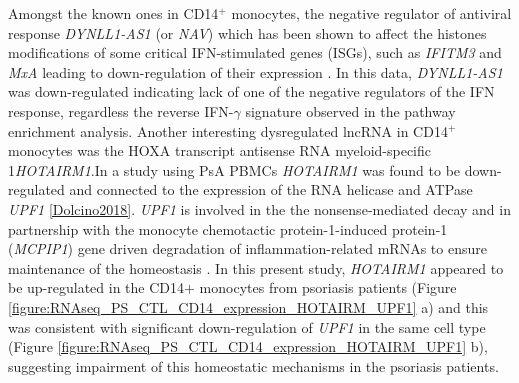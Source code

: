 Amongst the known ones in CD14$^+$ monocytes, the negative regulator of antiviral response \textit{DYNLL1-AS1} (or \textit{NAV}) which has been shown to affect the histones modifications of some critical IFN-stimulated genes (ISGs), such as \textit{IFITM3} and \textit{MxA} leading to down-regulation of their expression \parencite{Ouyang2014}. In this data, \textit{DYNLL1-AS1} was down-regulated indicating lack of one of the negative regulators of the IFN response, regardless the reverse IFN-$\gamma$ signature observed in the pathway enrichment analysis. Another interesting dysregulated lncRNA in CD14$^+$ monocytes was the HOXA transcript antisense RNA myeloid-specific 1\textit{HOTAIRM1}.In a study using PsA PBMCs \textit{HOTAIRM1} was found to be down-regulated and connected to the expression of the RNA helicase and ATPase \textit{UPF1} \ref{Dolcino2018}. \textit{UPF1} is involved in the the nonsense‐mediated decay and in partnership with the monocyte chemotactic protein-1-induced protein-1 (\textit{MCPIP1}) gene driven degradation of inflammation-related mRNAs to ensure maintenance of the homeostasis \parencite{Mino2015}. In this present study, \textit{HOTAIRM1} appeared to be up-regulated in the CD14$+$ monocytes from psoriasis patients (Figure \ref{figure:RNAseq_PS_CTL_CD14_expression_HOTAIRM_UPF1} a) and this was consistent with significant down-regulation of \textit{UPF1} in the same cell type (Figure \ref{figure:RNAseq_PS_CTL_CD14_expression_HOTAIRM_UPF1} b), suggesting impairment of this homeostatic mechanisms in the psoriasis patients. 



